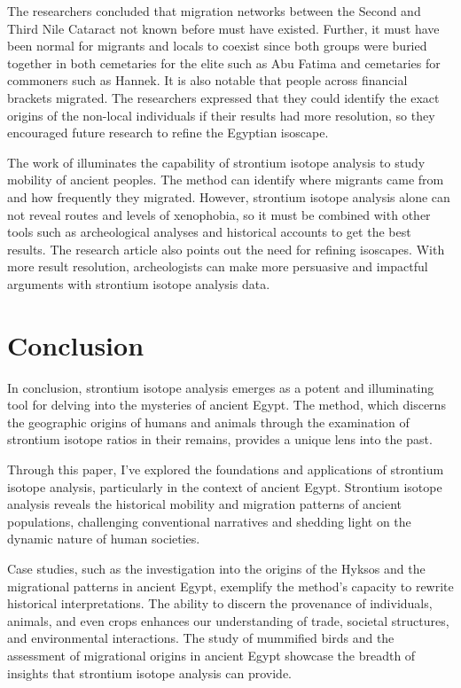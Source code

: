 \documentclass[a4paper, 12pt]{article}
\begin{document}
The researchers concluded that migration networks between the Second and Third
Nile Cataract not known before must have existed.
Further, it must have been normal
for migrants and locals to coexist since both groups were buried together in both
cemetaries for the elite such as Abu Fatima and cemetaries for commoners such
as Hannek. It is also notable that people across financial brackets migrated.
The researchers expressed that they could identify the exact origins of the non-local
individuals if their results had more resolution, so they encouraged
future research to refine the Egyptian isoscape.

The work of \cite{schrader2019} illuminates the capability of strontium isotope analysis
to study mobility of ancient peoples. The method can identify where migrants came
from and how frequently they migrated. However, strontium isotope analysis alone can
not reveal routes and levels of xenophobia, so it must be combined with other tools such as
archeological analyses and historical accounts to get the best results. The research
article also points out the need for refining isoscapes. With more result resolution,
archeologists can make more persuasive and impactful arguments with strontium isotope analysis data.


\section{Conclusion}
In conclusion, strontium isotope analysis emerges as a potent and illuminating
tool for delving into the mysteries of ancient Egypt. The method, which
discerns the geographic origins of humans and animals through the examination of
strontium isotope ratios in their remains, provides a unique lens into the past.

Through this paper, I've explored the foundations and applications of strontium
isotope analysis, particularly in the context of ancient Egypt. Strontium isotope
analysis reveals the historical mobility and migration patterns of ancient
populations, challenging conventional narratives and shedding light on the
dynamic nature of human societies.

Case studies, such as the investigation into the origins of the Hyksos and the
migrational patterns in ancient Egypt, exemplify the method's capacity to
rewrite historical interpretations. The ability to discern the provenance of
individuals, animals, and even crops enhances our understanding of trade,
societal structures, and environmental interactions. The study of mummified birds and the assessment of migrational origins in
ancient Egypt showcase the breadth of insights that strontium isotope analysis
can provide.
\end{document}
